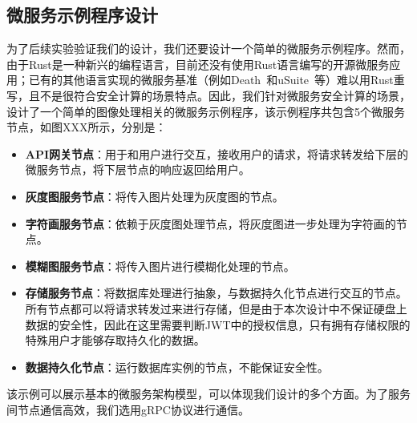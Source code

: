 \subsection{微服务示例程序设计}

为了后续实验验证我们的设计，我们还要设计一个简单的微服务示例程序。然而，由于Rust是一种新兴的编程语言，目前还没有使用Rust语言编写的开源微服务应用；已有的其他语言实现的微服务基准（例如Death~\cite{}和uSuite~\cite{}等）难以用Rust重写，且不是很符合安全计算的场景特点。因此，我们针对微服务安全计算的场景，设计了一个简单的图像处理相关的微服务示例程序，该示例程序共包含5个微服务节点，如图XXX所示，分别是：%

\begin{itemize}
    \item \textbf{API网关节点}：用于和用户进行交互，接收用户的请求，将请求转发给下层的微服务节点，将下层节点的响应返回给用户。
    \item \textbf{灰度图服务节点}：将传入图片处理为灰度图的节点。
    \item \textbf{字符画服务节点}：依赖于灰度图处理节点，将灰度图进一步处理为字符画的节点。
    \item \textbf{模糊图服务节点}：将传入图片进行模糊化处理的节点。
    \item \textbf{存储服务节点}：将数据库处理进行抽象，与数据持久化节点进行交互的节点。所有节点都可以将请求转发过来进行存储，但是由于本次设计中不保证硬盘上数据的安全性，因此在这里需要判断JWT中的授权信息，只有拥有存储权限的特殊用户才能够存取持久化的数据。
    \item \textbf{数据持久化节点}：运行数据库实例的节点，不能保证安全性。
\end{itemize}

该示例可以展示基本的微服务架构模型，可以体现我们设计的多个方面。为了服务间节点通信高效，我们选用gRPC协议进行通信。
